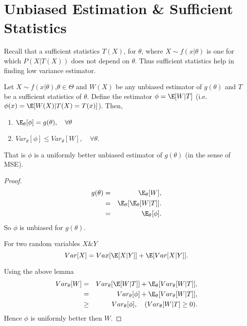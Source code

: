 \documentclass[a4paper,english,12pt]{article}
\begin{document}
\section{Unbiased Estimation \& Sufficient Statistics}
Recall that a sufficient statistics $T(X)$, for $\theta$, where $X \sim f(x|\theta)$ is one for which $P(X|T(X))$ does not depend on $\theta$. Thus sufficient statistics help in finding low variance estimator.
\begin{thm}
Let $X \sim f(x|\theta)$,$\theta \in \Theta$ and $W(X)$ be any unbiased estimator of $g(\theta)$ and $T$ be a sufficient statistics of $\theta$. Define the estimator $\phi = \E[W|T]$ (i.e. $\phi(x) = \E[W(X)|T(X) = T(x)]$). Then,
\begin{enumerate}
\item $\E_\theta[\phi] = g(\theta), \quad \forall \theta$
\item $Var_\theta[\phi] \leq Var_\theta[W], \quad \forall \theta$.
\end{enumerate}
That is $\phi$ is a uniformly better unbiased estimator of $g(\theta)$ (in the sense of MSE).
\end{thm}
\begin{proof}
\begin{eqnarray}
g(\theta) &=& \E_\theta[W],\nonumber\\
&=& \E_\theta[\E_\theta[W|T]]. \nonumber\\
&=& \E_\theta[\phi].
\end{eqnarray}
So $\phi$ is unbiased for $g(\theta)$.
\begin{lem}
For two random variables $X \& Y$
\begin{equation}
Var[X] = Vax[\E[X|Y]]  + \E[Var[X|Y]].
\end{equation}	
\end{lem}
Using the above lemma
\begin{eqnarray}
Var_\theta[W] &=& Var_\theta[\E[W|T]] + \E_\theta[Var_\theta[W|T]],\nonumber\\ 
&=&  Var_\theta[\phi] + \E_\theta[Var_\theta[W|T]], \nonumber\\ 
&\geq& Var_\theta[\phi], \quad (Var_\theta[W|T]\geq 0).
\end{eqnarray}
Hence $\phi$ is uniformly better then $W$.
\end{proof}
\end{document}
